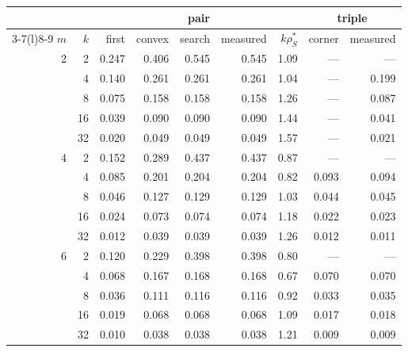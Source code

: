 \footnotesize
\begin{tabular}{rrrrrrrrr}
\toprule
& & \multicolumn{5}{c}{pair} & \multicolumn{2}{c}{triple} \\ \cmidrule(lr){3-7}\cmidrule(l){8-9}
$m$ & $k$ & first & convex & search & measured & $k\rho_S^\ast$ & corner & measured \\
\midrule
2 & 2 & 0.247 & 0.406 & 0.545 & 0.545 & 1.09 & --- & --- \\
 & 4 & 0.140 & 0.261 & 0.261 & 0.261 & 1.04 & --- & 0.199 \\
 & 8 & 0.075 & 0.158 & 0.158 & 0.158 & 1.26 & --- & 0.087 \\
 & 16 & 0.039 & 0.090 & 0.090 & 0.090 & 1.44 & --- & 0.041 \\
 & 32 & 0.020 & 0.049 & 0.049 & 0.049 & 1.57 & --- & 0.021 \\
\midrule
4 & 2 & 0.152 & 0.289 & 0.437 & 0.437 & 0.87 & --- & --- \\
 & 4 & 0.085 & 0.201 & 0.204 & 0.204 & 0.82 & 0.093 & 0.094 \\
 & 8 & 0.046 & 0.127 & 0.129 & 0.129 & 1.03 & 0.044 & 0.045 \\
 & 16 & 0.024 & 0.073 & 0.074 & 0.074 & 1.18 & 0.022 & 0.023 \\
 & 32 & 0.012 & 0.039 & 0.039 & 0.039 & 1.26 & 0.012 & 0.011 \\
\midrule
6 & 2 & 0.120 & 0.229 & 0.398 & 0.398 & 0.80 & --- & --- \\
 & 4 & 0.068 & 0.167 & 0.168 & 0.168 & 0.67 & 0.070 & 0.070 \\
 & 8 & 0.036 & 0.111 & 0.116 & 0.116 & 0.92 & 0.033 & 0.035 \\
 & 16 & 0.019 & 0.068 & 0.068 & 0.068 & 1.09 & 0.017 & 0.018 \\
 & 32 & 0.010 & 0.038 & 0.038 & 0.038 & 1.21 & 0.009 & 0.009 \\
\bottomrule
\end{tabular}

